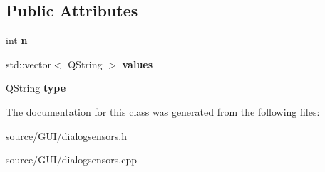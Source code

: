 \subsection*{Public Attributes}
\begin{DoxyCompactItemize}
\item 
int {\bfseries n}\label{class_dialog_sensors_a57f9ff01771bd4ccfebc4dba6e8009ba}

\item 
std\+::vector$<$ Q\+String $>$ {\bfseries values}\label{class_dialog_sensors_a5b87896eff5ef3b41d5e93c2f241e0a9}

\item 
Q\+String {\bfseries type}\label{class_dialog_sensors_a2e23b1e6ab483258cd8702bed1800780}

\end{DoxyCompactItemize}


The documentation for this class was generated from the following files\+:\begin{DoxyCompactItemize}
\item 
source/\+G\+U\+I/dialogsensors.\+h\item 
source/\+G\+U\+I/dialogsensors.\+cpp\end{DoxyCompactItemize}

